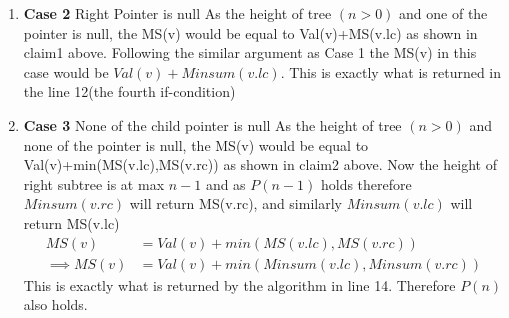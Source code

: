 \documentclass[answers]{exam}
\begin{document}
\begin{questions}
\begin{solution}
\begin{enumerate}

\item \textbf{Case 2} Right Pointer is null
\newline As the height of tree $(n>0)$ and one of the pointer is null, the MS(v) would be equal to Val(v)+MS(v.lc) as shown in claim1 above.
\newline Following the similar argument as Case 1 the MS(v) in this case would be $Val(v)+Minsum(v.lc)$. This is exactly what is returned in the line 12(the fourth if-condition)

\item \textbf{Case 3} None of the child pointer is null
\newline  As the height of tree $(n>0)$ and none of the pointer is null, the MS(v) would be equal to Val(v)+min(MS(v.lc),MS(v.rc)) as shown in claim2 above.
\newline Now the height of right subtree is at max $n-1$ and as $P(n-1)$ holds therefore $Minsum(v.rc)$ will return MS(v.rc), and similarly $Minsum(v.lc)$ will return MS(v.lc)
\begin{align*}
    MS(v) &= Val(v)+min(MS(v.lc),MS(v.rc)) \\
    \implies MS(v) &= Val(v)+min(Minsum(v.lc),Minsum(v.rc))
\end{align*}
This is exactly what is returned by the algorithm in line 14. Therefore $P(n)$ also holds.
\end{enumerate}


\end{solution}
\end{questions}
\end{document}
